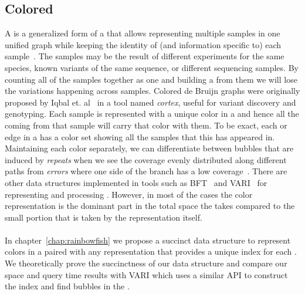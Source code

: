 \subsection{Colored \dbg}
A \cdbg is a generalized form of a \dbg that allows representing multiple samples
in one unified graph while keeping the identity of (and information specific to) each sample~\cite{Iqbal2012Novo}.
The samples may be the result of different experiments for the same species, known variants of the same sequence,
or different sequencing samples. By counting all of the samples together as one
and building a \dbg from them we will lose the variations happening across samples.
Colored de Bruijn graphs were originally proposed by Iqbal et. al~\cite{Iqbal2012Novo}
in a tool named \emph{cortex}, useful for variant discovery and genotyping.
Each sample is represented with a unique color in a \cdbg and
hence all the \kmers coming from that sample will carry that color with them.
To be exact, each \kmer or edge in a \cdbg has a color set showing all the samples
that this \kmer has appeared in.
Maintaining each color separately, we can differentiate between bubbles that are induced by \emph{repeats}
when we see the coverage evenly distributed along different paths from \emph{errors}
where one side of the branch has a low coverage~\cite{Iqbal2012Novo}.
There are other data structures implemented in tools such as BFT~\cite{holley2016bloom}
and VARI~\cite{MuggliBoNo17} for representing and processing \cdbgs.
However, in most of the cases the color representation is the dominant part in the total space
the \cdbg takes compared to the small portion that is taken by the \dbg representation itself.

\paragraph*{}
In chapter~\ref{chap:rainbowfish} we propose a succinct data structure to represent colors in a \cdbg
paired with any \dbg representation that provides a unique index for each \kmer.
We theoretically prove the succinctness of our data structure and compare our space and query time results
with VARI which uses a similar API to construct the index and find bubbles in the \cdbg.


